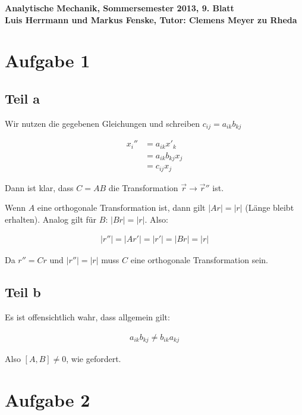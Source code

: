 \documentclass[a4paper,german,12pt,smallheadings]{scrartcl}
\begin{document}
\begin{center}
\bfseries %
\sffamily %
\vspace{-40pt}
Analytische Mechanik, Sommersemester 2013, 9. Blatt \\
Luis Herrmann und Markus Fenske, Tutor: Clemens Meyer zu Rheda
\vspace{-10pt}
\end{center}
\section*{Aufgabe 1}
\subsection*{Teil a}

Wir nutzen die gegebenen Gleichungen und schreiben $c_{ij} = a_{ik} b_{kj}$

\begin{align*}
  x_i'' &= a_{ik} x'_k \\
        &= a_{ik} b_{kj} x_j \\
        &= c_{ij} x_j
\end{align*}

Dann ist klar, dass $C = AB$ die Transformation $\vec{r} \to \vec{r}''$ ist.

Wenn $A$ eine orthogonale Transformation ist, dann gilt $|Ar| = |r|$ (Länge
bleibt erhalten). Analog gilt für $B$: $|Br| = |r|$. Also:

\begin{align*}
  |r''| = |Ar'| = |r'| = |Br| = |r|
\end{align*}

Da $r'' = Cr$ und $|r''| = |r|$ muss $C$ eine orthogonale Transformation sein.

\subsection*{Teil b}

Es ist offensichtlich wahr, dass allgemein gilt:

\begin{align*}
  a_{ik} b_{kj} \neq b_{ik} a_{kj}
\end{align*}

Also $[A,B] \neq 0$, wie gefordert.


\section*{Aufgabe 2}
\end{document}
